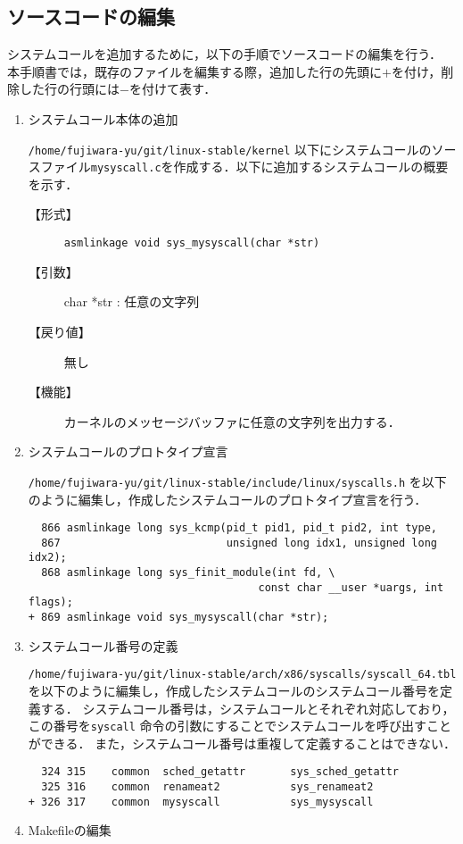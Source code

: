 \documentclass[12pt]{jsarticle}
\begin{document}
\subsection{ソースコードの編集}
システムコールを追加するために，以下の手順でソースコードの編集を行う．
本手順書では，既存のファイルを編集する際，追加した行の先頭に$+$を付け，削除した行の行頭には$-$を付けて表す．
\begin{enumerate}

\item システムコール本体の追加

\verb|/home/fujiwara-yu/git/linux-stable/kernel| 以下にシステムコールのソースファイル\verb|mysyscall.c|を作成する．以下に追加するシステムコールの概要を示す．
\begin{description}
\item[【形式】]\verb|asmlinkage void sys_mysyscall(char *str)|

\item[【引数】]char *str : 任意の文字列

\item [【戻り値】]無し

\item [【機能】]カーネルのメッセージバッファに任意の文字列を出力する．

\end{description}

\item システムコールのプロトタイプ宣言

\verb|/home/fujiwara-yu/git/linux-stable/include/linux/syscalls.h| を以下のように編集し，作成したシステムコールのプロトタイプ宣言を行う．
\begin{verbatim}
  866 asmlinkage long sys_kcmp(pid_t pid1, pid_t pid2, int type,
  867                          unsigned long idx1, unsigned long idx2);
  868 asmlinkage long sys_finit_module(int fd, \ 
                                    const char __user *uargs, int flags);
+ 869 asmlinkage void sys_mysyscall(char *str);
\end{verbatim}
\item システムコール番号の定義

\verb|/home/fujiwara-yu/git/linux-stable/arch/x86/syscalls/syscall_64.tbl| を以下のように編集し，作成したシステムコールのシステムコール番号を定義する．
システムコール番号は，システムコールとそれぞれ対応しており，この番号を\verb|syscall| 命令の引数にすることでシステムコールを呼び出すことができる．
また，システムコール番号は重複して定義することはできない．
\begin{verbatim}
  324 315    common  sched_getattr       sys_sched_getattr
  325 316    common  renameat2           sys_renameat2
+ 326 317    common  mysyscall           sys_mysyscall
\end{verbatim}
\item Makefileの編集


\end{enumerate}
\end{document}
